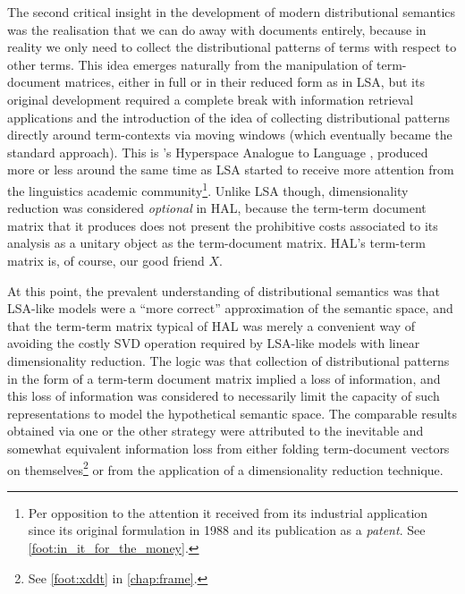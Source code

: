 The second critical insight in the development of modern distributional semantics was the realisation that we can do away with documents entirely, because in reality we only need to collect the distributional patterns of terms with respect to other terms.
This idea emerges naturally from the manipulation of term-document matrices, either in full or in their reduced form as in LSA, but its original development required a complete break with information retrieval applications and the introduction of the idea of collecting distributional patterns directly around term-contexts via moving windows (which eventually became the standard approach).
This is \citeauthor{lund1996}'s Hyperspace Analogue to Language \citep{lund1995,lund1996}, produced more or less around the same time as LSA started to receive more attention from the linguistics academic community\footnote{
     Per opposition to the attention it received from its industrial application since its original formulation in 1988 and its publication as a \emph{patent}.
     See \autoref{foot:in_it_for_the_money}.
}.
Unlike LSA though, dimensionality reduction was considered \emph{optional} in HAL, because the term-term document matrix that it produces does not present the prohibitive costs associated to its analysis as a unitary object as the term-document matrix.
HAL's term-term matrix is, of course, our good friend $X$.

At this point, the prevalent understanding of distributional semantics was that LSA-like models were a ``more correct'' approximation of the semantic space, and that the term-term matrix typical of HAL was merely a convenient way of avoiding the costly SVD operation required by LSA-like models with linear dimensionality reduction.
The logic was that collection of distributional patterns in the form of a term-term document matrix implied a loss of information, and this loss of information was considered to necessarily limit the capacity of such representations to model the hypothetical semantic space.
The comparable results obtained via one or the other strategy were attributed to the inevitable and somewhat equivalent information loss from either folding term-document vectors on themselves\footnote{
    See \autoref{foot:xddt} in \autoref{chap:frame}.
} or from the application of a dimensionality reduction technique.


